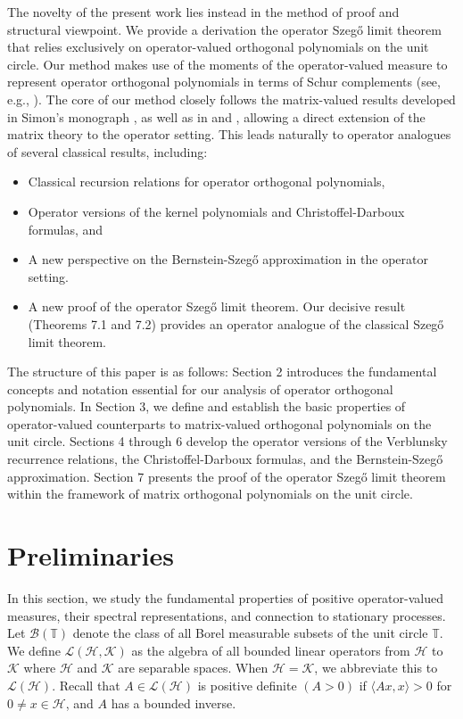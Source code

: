 \documentclass[11pt]{article}
\begin{document}
The novelty of the present work lies instead in the method of proof and structural viewpoint. We provide a derivation the operator Szeg\H{o} limit theorem that relies exclusively on operator-valued orthogonal polynomials on the unit circle. Our method makes use of the moments of the operator-valued measure to represent operator orthogonal polynomials in terms of Schur complements (see, e.g., \cite{Zha}). The core of our method closely follows the matrix-valued results developed in Simon's monograph \cite[Section 2.13]{Sim2}, as well as in \cite{DamPS} and \cite{DerHK}, allowing a direct extension of the matrix theory to the operator setting. This leads naturally to operator analogues of several classical results, including:
\begin{itemize}
    \item Classical recursion relations for operator orthogonal polynomials,
    \item Operator versions of the kernel polynomials and Christoffel-Darboux formulas, and
    \item A new perspective on the Bernstein-Szeg\H{o} approximation in the operator setting.
    \item A new proof of the operator Szeg\H{o} limit theorem. Our decisive result (Theorems 7.1 and 7.2) provides an operator analogue of the classical Szeg\H{o} limit theorem.
\end{itemize}

The structure of this paper is as follows: Section 2 introduces the fundamental concepts and notation essential for our analysis of operator orthogonal polynomials. In Section 3, we define and establish the basic properties of operator-valued counterparts to matrix-valued orthogonal polynomials on the unit circle. Sections 4 through 6 develop the operator versions of the Verblunsky recurrence relations, the Christoffel-Darboux formulas, and the Bernstein-Szeg\H{o} approximation. Section 7 presents the proof of the operator Szeg\H{o} limit theorem within the framework of matrix orthogonal polynomials on the unit circle.

\section{Preliminaries} 
In this section, we study the fundamental properties of positive operator-valued measures, their spectral representations, and connection to stationary processes.\\

Let $\mathcal{B}(\mathbb{T})$ denote the class of all Borel measurable subsets of the unit circle $\mathbb{T}$. We define $\mathcal{L}(\mathcal{H},\mathcal{K})$ as the algebra of all bounded linear operators from $\mathcal{H}$ to $\mathcal{K}$ where $\mathcal{H}$ and $\mathcal{K}$ are separable spaces. When $\mathcal{H} = \mathcal{K}$, we abbreviate this to $\mathcal{L}(\mathcal{H})$. Recall that $A \in \mathcal{L}(\mathcal{H})$ is positive definite $(A>0)$ if $\langle A x, x \rangle >0$ for $0 \neq x \in \mathcal{H}$, and $A$ has a bounded inverse.
\end{document}
